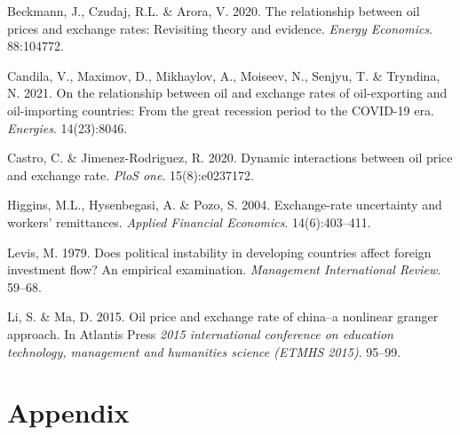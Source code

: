 \documentclass[11pt,preprint, authoryear]{elsarticle}
\numberwithin{equation}{section}
\numberwithin{figure}{section}
\numberwithin{table}{section}
\newlength{\cslhangindent}
\newenvironment{CSLReferences}%
  {\setlength{\parindent}{0pt}%
  \everypar{\setlength{\hangindent}{\cslhangindent}}\ignorespaces}%
  {\par}
\begin{document}
\hypertarget{refs}{}
\begin{CSLReferences}{1}{0}
\leavevmode{}%
Beckmann, J., Czudaj, R.L. \& Arora, V. 2020. The relationship between
oil prices and exchange rates: Revisiting theory and evidence.
\emph{Energy Economics}. 88:104772.

\leavevmode{}%
Candila, V., Maximov, D., Mikhaylov, A., Moiseev, N., Senjyu, T. \&
Tryndina, N. 2021. On the relationship between oil and exchange rates of
oil-exporting and oil-importing countries: From the great recession
period to the COVID-19 era. \emph{Energies}. 14(23):8046.

\leavevmode{}%
Castro, C. \& Jimenez-Rodriguez, R. 2020. Dynamic interactions between
oil price and exchange rate. \emph{PloS one}. 15(8):e0237172.

\leavevmode{}%
Higgins, M.L., Hysenbegasi, A. \& Pozo, S. 2004. Exchange-rate
uncertainty and workers' remittances. \emph{Applied Financial
Economics}. 14(6):403--411.

\leavevmode{}%
Levis, M. 1979. Does political instability in developing countries
affect foreign investment flow? An empirical examination.
\emph{Management International Review}. 59--68.

\leavevmode{}%
Li, S. \& Ma, D. 2015. Oil price and exchange rate of china--a nonlinear
granger approach. In Atlantis Press \emph{2015 international conference
on education technology, management and humanities science (ETMHS
2015)}. 95--99.

\end{CSLReferences}

\hypertarget{appendix}{%
\section*{Appendix}\label{appendix}}
\end{document}
